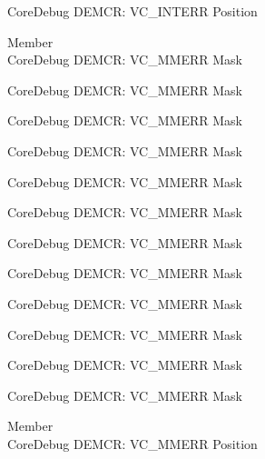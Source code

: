 \begin{DoxyRefList}
\label{deprecated__deprecated001269}%
%
Core\+Debug DEMCR\+: VC\+\_\+\+INTERR Position  
\item[Member \doxylink{group___c_m_s_i_s___core_debug_gad420a9b60620584faaca6289e83d3a87}{Core\+Debug\+\_\+\+DEMCR\+\_\+\+VC\+\_\+\+MMERR\+\_\+\+Msk} ]\hfill \\
\label{deprecated__deprecated000068}%
%
Core\+Debug DEMCR\+: VC\+\_\+\+MMERR Mask 

\label{deprecated__deprecated000212}%
%
Core\+Debug DEMCR\+: VC\+\_\+\+MMERR Mask 

\label{deprecated__deprecated000354}%
%
Core\+Debug DEMCR\+: VC\+\_\+\+MMERR Mask 

\label{deprecated__deprecated000430}%
%
Core\+Debug DEMCR\+: VC\+\_\+\+MMERR Mask 

\label{deprecated__deprecated000519}%
%
Core\+Debug DEMCR\+: VC\+\_\+\+MMERR Mask 

\label{deprecated__deprecated000621}%
%
Core\+Debug DEMCR\+: VC\+\_\+\+MMERR Mask 

\label{deprecated__deprecated000727}%
%
Core\+Debug DEMCR\+: VC\+\_\+\+MMERR Mask 

\label{deprecated__deprecated000871}%
%
Core\+Debug DEMCR\+: VC\+\_\+\+MMERR Mask 

\label{deprecated__deprecated001013}%
%
Core\+Debug DEMCR\+: VC\+\_\+\+MMERR Mask 

\label{deprecated__deprecated001089}%
%
Core\+Debug DEMCR\+: VC\+\_\+\+MMERR Mask 

\label{deprecated__deprecated001178}%
%
Core\+Debug DEMCR\+: VC\+\_\+\+MMERR Mask 

\label{deprecated__deprecated001280}%
%
Core\+Debug DEMCR\+: VC\+\_\+\+MMERR Mask  
\item[Member \doxylink{group___c_m_s_i_s___core_debug_ga444454f7c7748e76cd76c3809c887c41}{Core\+Debug\+\_\+\+DEMCR\+\_\+\+VC\+\_\+\+MMERR\+\_\+\+Pos} ]\hfill \\
\label{deprecated__deprecated000067}%
%
Core\+Debug DEMCR\+: VC\+\_\+\+MMERR Position 


\end{DoxyRefList}
